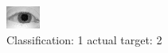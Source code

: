 \begin{figure}[h!]
\begin{center}
\includegraphics[width=0.60\columnwidth]{figures/ID956_class_1_target_2.png}
\end{center}
\caption{ Classification: 1 actual target: 2}
\label{fig:ID956_class_1_target_2}
\end{figure}
